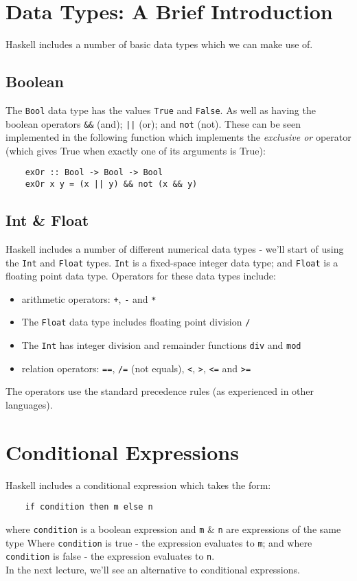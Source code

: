 \section{Data Types: A Brief Introduction}
Haskell includes a number of basic data types which we can make use of.
\subsection{Boolean}
The \verb|Bool| data type has the values \verb|True| and \verb|False|. As well as having the boolean operators \verb|&&| (and); \verb+||+ (or); and \verb|not| (not). These can be seen implemented in the following function which implements the \textit{exclusive or} operator (which gives True when exactly one of its arguments is True):
\begin{verbatim}
    exOr :: Bool -> Bool -> Bool
    exOr x y = (x || y) && not (x && y)
\end{verbatim}

\subsection{Int \& Float}
Haskell includes a number of different numerical data types - we'll start of using the \verb|Int| and \verb|Float| types. \verb|Int| is a fixed-space integer data type; and \verb|Float| is a floating point data type. Operators for these data types include:
\begin{itemize}
    \item arithmetic operators: \verb|+|, \verb|-| and \verb|*|
    \item The \verb|Float| data type includes floating point division \verb|/|
    \item The \verb|Int| has integer division and remainder functions \verb|div| and \verb|mod|
    \item relation operators: \verb|==|, \verb|/=| (not equals), \verb|<|, \verb|>|, \verb|<=| and \verb|>=|
\end{itemize}
The operators use the standard precedence rules (as experienced in other languages). 

\section{Conditional Expressions}
Haskell includes a conditional expression which takes the form:
\begin{verbatim}
    if condition then m else n
\end{verbatim}
where \verb|condition| is a boolean expression and \verb|m| \& \verb|n| are expressions of the same type Where \verb|condition| is true - the expression evaluates to \verb|m|; and where \verb|condition| is false - the expression evaluates to \verb|n|.\\

In the next lecture, we'll see an alternative to conditional expressions.